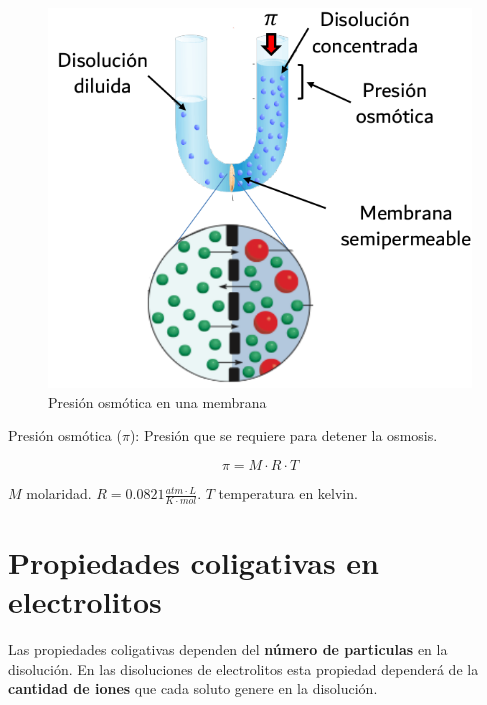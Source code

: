 \documentclass[]{article}
\begin{document}
\begin{figure}[H]
\center
\includegraphics[scale=0.33]{foto20.png}
\caption{Presión osmótica en una membrana}
\end{figure}

Presión osmótica ($\pi$): Presión que se requiere para detener la osmosis.

\begin{equation}
 \pi = M \cdot R \cdot T
 \end{equation} 

$M$ molaridad. $R=0.0821 \frac{atm \cdot L}{K \cdot mol}$. $T$ temperatura en kelvin.



\section{Propiedades coligativas en electrolitos}
Las propiedades coligativas dependen del \textbf{número de particulas} en la disolución. En las disoluciones de electrolitos esta propiedad dependerá de la \textbf{cantidad de iones} que cada soluto genere en la disolución.
\end{document}

